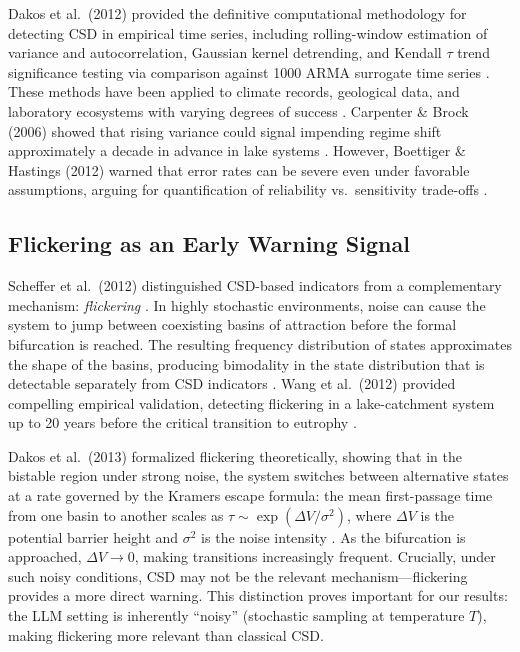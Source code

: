 \documentclass[11pt,letterpaper]{article}
\begin{document}
Dakos et al.~(2012) provided the definitive computational methodology for detecting CSD in empirical time series, including rolling-window estimation of variance and autocorrelation, Gaussian kernel detrending, and Kendall $\tau$ trend significance testing via comparison against 1000 ARMA surrogate time series \cite{dakos2012methods}. These methods have been applied to climate records, geological data, and laboratory ecosystems with varying degrees of success \cite{bury2021}. Carpenter \& Brock (2006) showed that rising variance could signal impending regime shift approximately a decade in advance in lake systems \cite{carpenter2006}. However, Boettiger \& Hastings (2012) warned that error rates can be severe even under favorable assumptions, arguing for quantification of reliability vs.~sensitivity trade-offs \cite{boettiger2012}.

\subsection{Flickering as an Early Warning Signal}

Scheffer et al.~(2012) distinguished CSD-based indicators from a complementary mechanism: \emph{flickering} \cite{scheffer2012}. In highly stochastic environments, noise can cause the system to jump between coexisting basins of attraction before the formal bifurcation is reached. The resulting frequency distribution of states approximates the shape of the basins, producing bimodality in the state distribution that is detectable separately from CSD indicators \cite{dakos2013}. Wang et al.~(2012) provided compelling empirical validation, detecting flickering in a lake-catchment system up to 20 years before the critical transition to eutrophy \cite{wang2012flickering}.

Dakos et al.~(2013) formalized flickering theoretically, showing that in the bistable region under strong noise, the system switches between alternative states at a rate governed by the Kramers escape formula: the mean first-passage time from one basin to another scales as $\tau \sim \exp(\Delta V / \sigma^2)$, where $\Delta V$ is the potential barrier height and $\sigma^2$ is the noise intensity \cite{dakos2013}. As the bifurcation is approached, $\Delta V \to 0$, making transitions increasingly frequent. Crucially, under such noisy conditions, CSD may not be the relevant mechanism---flickering provides a more direct warning. This distinction proves important for our results: the LLM setting is inherently ``noisy'' (stochastic sampling at temperature $T$), making flickering more relevant than classical CSD.
\end{document}
